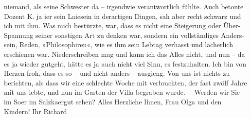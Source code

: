 \begin{ledgroupsized}[t]{13cm}
               niemand, als seine Schwester
               da – irgendwie verantwortlich fühlte. Auch betonte Dozent K. ja i{\geminationm}er sein Laiesein in
               derartigen Dingen, sah aber recht schwarz {\pb}und ich mit ihm. Was mich
               bestürzte, war, dass es nicht eine Steigerung oder Über-Spannung seiner sonstigen Art
               zu denken war, sondern ein vollständiges Anders-sein, Reden, »Philosophiren«, wie es
               ihm sein Lebtag verhasst und lächerlich erschienen war. Niederschreiben mag und kann
               ich das Alles nicht, und nun – da es ja wieder gutgeht, hätte es ja auch nicht viel
               Sinn, es festzuhalten.\pend
           \pstart
           Ich bin von Herzen froh, dass es so – und nicht anders – ausgieng.\pend
           \pstart
           Von uns ist nichts zu berichten, als dass wir eine schlechte Woche mit \label{K_L02266-1v}\label{K_L02266-1h} verbrachten, der fast zwölf Jahre mit uns lebte, und nun im Garten der Villa
               begraben wurde. –\pend
           \pstart
           Werden wir Sie im So{\geminationm}er im Salzka{\geminationm}ergut sehen?\pend
           \pstart
           Alles Herzliche Ihnen, Frau Olga und den Kindern! Ihr\pend
           \pstart \spacefill\mbox{Richard}\pend{}
         
         \endnumbering{}\end{ledgroupsized}  \newcommand{\dateiname}{L02266}\newcommand{\titel}{Richard Beer-Hofmann an Arthur Schnitzler, 18. 7. 1917}\newcommand{\editorInnen}{Martin Anton Müller und Gerd-Hermann Susen}
      
